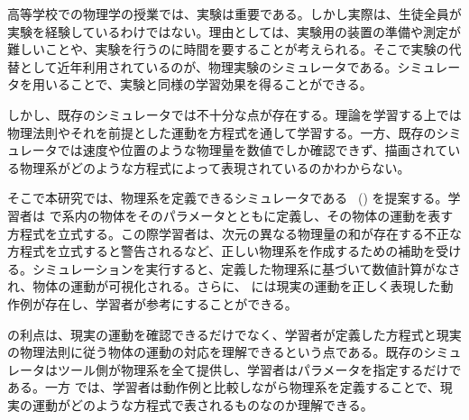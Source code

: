 高等学校での物理学の授業では、実験は重要である。しかし実際は、生徒全員が実験を経験しているわけではない。理由としては、実験用の装置の準備や測定が難しいことや、実験を行うのに時間を要することが考えられる。そこで実験の代替として近年利用されているのが、物理実験のシミュレータである。シミュレータを用いることで、実験と同様の学習効果を得ることができる。

しかし、既存のシミュレータでは不十分な点が存在する。理論を学習する上では物理法則やそれを前提とした運動を方程式を通して学習する。一方、既存のシミュレータでは速度や位置のような物理量を数値でしか確認できず、描画されている物理系がどのような方程式によって表現されているのかわからない。

そこで本研究では、物理系を定義できるシミュレータである \simname~(\simnamealt) を提案する。学習者は \simname で系内の物体をそのパラメータとともに定義し、その物体の運動を表す方程式を立式する。この際学習者は、次元の異なる物理量の和が存在する不正な方程式を立式すると警告されるなど、正しい物理系を作成するための補助を受ける。シミュレーションを実行すると、定義した物理系に基づいて数値計算がなされ、物体の運動が可視化される。さらに、 \simname には現実の運動を正しく表現した動作例が存在し、学習者が参考にすることができる。

\simname の利点は、現実の運動を確認できるだけでなく、学習者が定義した方程式と現実の物理法則に従う物体の運動の対応を理解できるという点である。既存のシミュレータはツール側が物理系を全て提供し、学習者はパラメータを指定するだけである。一方 \simname では、学習者は動作例と比較しながら物理系を定義することで、現実の運動がどのような方程式で表されるものなのか理解できる。